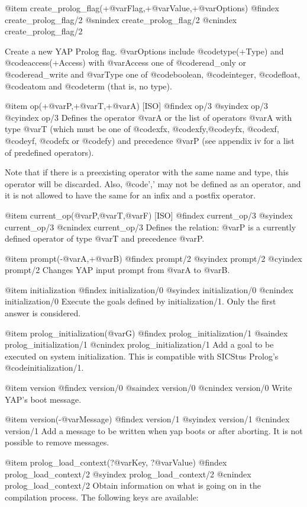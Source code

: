 {{{{{{{{@item create_prolog_flag(+@var{Flag},+@var{Value},+@var{Options})
@findex create_prolog_flag/2
@snindex create_prolog_flag/2
@cnindex create_prolog_flag/2

Create a new YAP Prolog flag. @var{Options} include @code{type(+Type)} and @code{access(+Access)} with @var{Access}
one of @code{read_only} or @code{read_write} and @var{Type} one of @code{boolean}, @code{integer}, @code{float}, @code{atom}
and @code{term} (that is, no type).

@item op(+@var{P},+@var{T},+@var{A}) [ISO]
@findex op/3
@syindex op/3
@cyindex op/3
Defines the operator @var{A} or the list of operators @var{A} with type
@var{T} (which must be one of @code{xfx}, @code{xfy},@code{yfx},
@code{xf}, @code{yf}, @code{fx} or @code{fy}) and precedence @var{P}
(see appendix iv for a list of predefined operators).

Note that if there is a preexisting operator with the same name and
type, this operator will be discarded. Also, @code{','} may not be defined
as an operator, and it is not allowed to have the same for an infix and
a postfix operator.

@item current_op(@var{P},@var{T},@var{F}) [ISO]
@findex current_op/3
@syindex current_op/3
@cnindex current_op/3
Defines the relation: @var{P} is a currently defined  operator of type
@var{T} and precedence @var{P}.

@item prompt(-@var{A},+@var{B})
@findex prompt/2
@syindex prompt/2
@cyindex prompt/2
Changes YAP input prompt from @var{A} to @var{B}.

@item initialization
@findex initialization/0
@syindex initialization/0
@cnindex initialization/0
Execute the goals defined by initialization/1. Only the first answer is
considered.

@item prolog_initialization(@var{G})
@findex prolog_initialization/1
@saindex prolog_initialization/1
@cnindex prolog_initialization/1
Add a goal to be executed on system initialization. This is compatible
with SICStus Prolog's @code{initialization/1}.

@item version
@findex version/0
@saindex version/0
@cnindex version/0
Write YAP's boot message. 

@item version(-@var{Message})
@findex version/1
@syindex version/1
@cnindex version/1
Add a message to be written when yap boots or after aborting. It is not
possible to remove messages.

@item prolog_load_context(?@var{Key}, ?@var{Value})
@findex prolog_load_context/2
@syindex prolog_load_context/2
@cnindex prolog_load_context/2
Obtain information on what is going on in the compilation process. The
following keys are available:

}}}}}}}}
